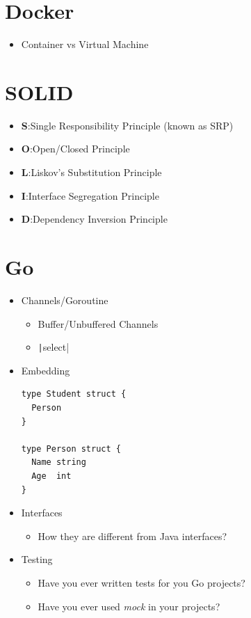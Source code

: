 \documentclass[]{article}
\begin{document}
\begin{multicols}{2}
\section{Docker}

\begin{itemize}
  \item Container vs Virtual Machine
\end{itemize}

\section{SOLID}

\begin{itemize}
  \item \textbf{S}:\@ Single Responsibility Principle (known as SRP)
  \item \textbf{O}:\@ Open/Closed Principle
  \item \textbf{L}:\@ Liskov’s Substitution Principle
  \item \textbf{I}:\@ Interface Segregation Principle
  \item \textbf{D}:\@ Dependency Inversion Principle
\end{itemize}

\section{Go}

\begin{itemize}
  \item Channels/Goroutine
  \begin{itemize}
    \item Buffer/Unbuffered Channels
    \item \texttt|select|
  \end{itemize}
  \item Embedding
  \begin{verbatim}
type Student struct {
  Person
}

type Person struct {
  Name string
  Age  int
}
  \end{verbatim}

  \item Interfaces
  \begin{itemize}
    \item How they are different from Java interfaces?
  \end{itemize}

  \item Testing
  \begin{itemize}
    \item Have you ever written tests for you Go projects?
    \item Have you ever used \textit{mock} in your projects?
  \end{itemize}


\end{itemize}
\end{multicols}
\end{document}
